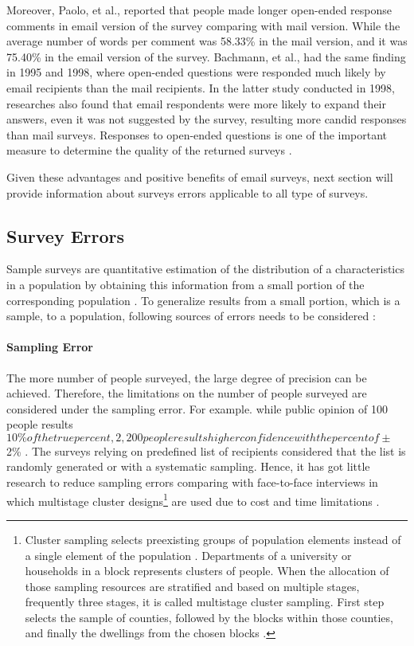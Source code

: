 Moreover, Paolo, et al., \cite{Paolo2009} reported that people made longer open-ended response comments in email version of the survey comparing with mail version. While the average number of words per comment was 58.33\% in the mail version, and it was 75.40\% in the email version of the survey. Bachmann, et al., \cite{BachmannD.ElfrinkJ.&Vazzana1999} had the same finding in 1995 and 1998, where open-ended questions were responded much likely by email recipients than the mail recipients. In the latter study conducted in 1998, researches also found that email respondents were more likely to expand their answers, even it was not suggested by the survey, resulting more candid responses than mail surveys. Responses to open-ended questions is one of the important measure to determine the quality of the returned surveys \cite{BachmannD.ElfrinkJ.&Vazzana1999}.
\vspace{1cm}

Given these advantages and positive benefits of email surveys, next section will provide information about surveys errors applicable to all type of surveys.

\subsection{Survey Errors}
\label{sec:2.1.2:SurErr}
Sample surveys are quantitative estimation of the distribution of a characteristics in a population by obtaining this information from a small portion of the corresponding population \cite{Dillman1991}. To generalize results from a small portion, which is a sample, to a population, following sources of errors needs to be considered \cite[page 9]{Dillman2006} \cite{Dillman1991}:

\paragraph{Sampling Error}
The more number of people surveyed, the large degree of precision can be achieved. Therefore, the limitations on the number of people surveyed are considered under the sampling error. For example. while public opinion of 100 people results \pm$10\% of the true percent, 2,200 people results higher confidence with the percent of \pm$2\% \cite[page 9]{Dillman2006}. The surveys relying on predefined list of recipients considered that the list is randomly generated or with a systematic sampling. Hence, it has got little research to reduce sampling errors comparing with face-to-face interviews in which multistage cluster designs\footnote{Cluster sampling selects preexisting groups of population elements instead of a single element of the population \cite[page 106]{Groves2009}. Departments of a university or households in a block represents clusters of people. When the allocation of those sampling resources are stratified and based on multiple stages, frequently three stages, it is called multistage cluster sampling. First step selects the sample of counties, followed by the blocks within those counties, and finally the dwellings from the chosen blocks \cite{Scott1969}.} are used due to cost and time limitations \cite[page 106]{Groves2009} \cite{Dillman1991}.

